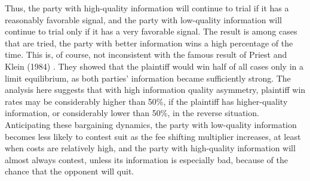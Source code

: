 \documentclass{article}
\begin{document}
Thus, the party with high-quality information will continue to trial if it has a reasonably favorable signal, and the party with low-quality information will continue to trial only if it has a very favorable signal. The result is among cases that are tried, the party with better information wins a high percentage of the time. This is, of course, not inconsistent with the famous result of Priest and Klein (1984) \cite{priestklein}. They showed that the plaintiff would win half of all cases only in a limit equilibrium, as both parties' information became sufficiently strong. The analysis here suggests that with high information quality asymmetry, plaintiff win rates may be considerably higher than 50\%, if the plaintiff has higher-quality information, or considerably lower than 50\%, in the reverse situation. Anticipating these bargaining dynamics, the party with low-quality information becomes less likely to contest suit as the fee shifting multiplier increases, at least when costs are relatively high, and the party with high-quality information will almost always contest, unless its information is especially bad, because of the chance that the opponent will quit.
\end{document}
